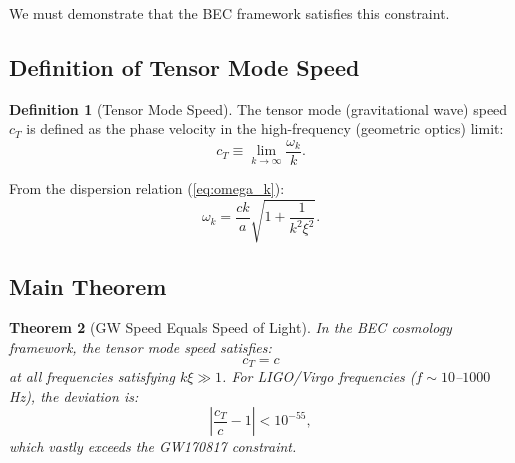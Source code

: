 \documentclass[11pt,a4paper]{article}
\newcommand{\cT}{\ensuremath{c_T}}
\newtheorem{theorem}{Theorem}[section]
\theoremstyle{definition}
\newtheorem{definition}[theorem]{Definition}
\theoremstyle{remark}
\begin{document}
We must demonstrate that the BEC framework satisfies this constraint.

\subsection{Definition of Tensor Mode Speed}
\label{sec:speed_definition}

\begin{definition}[Tensor Mode Speed]
The tensor mode (gravitational wave) speed $\cT$ is defined as the phase velocity in the high-frequency (geometric optics) limit:
\begin{equation}
\cT \equiv \lim_{k \to \infty} \frac{\omega_k}{k}.
\end{equation}
\end{definition}

From the dispersion relation (\ref{eq:omega_k}):
\begin{equation}
\omega_k = \frac{ck}{a}\sqrt{1 + \frac{1}{k^2\xi^2}}.
\end{equation}

\subsection{Main Theorem}
\label{sec:main_theorem}

\begin{theorem}[GW Speed Equals Speed of Light]
\label{thm:cT_equals_c}
In the BEC cosmology framework, the tensor mode speed satisfies:
\begin{equation}
\boxed{\cT = c}
\end{equation}
at all frequencies satisfying $k\xi \gg 1$. For LIGO/Virgo frequencies ($f \sim 10$--$1000$ Hz), the deviation is:
\begin{equation}
\left|\frac{\cT}{c} - 1\right| < 10^{-55},
\end{equation}
which vastly exceeds the GW170817 constraint.
\end{theorem}
\end{document}
